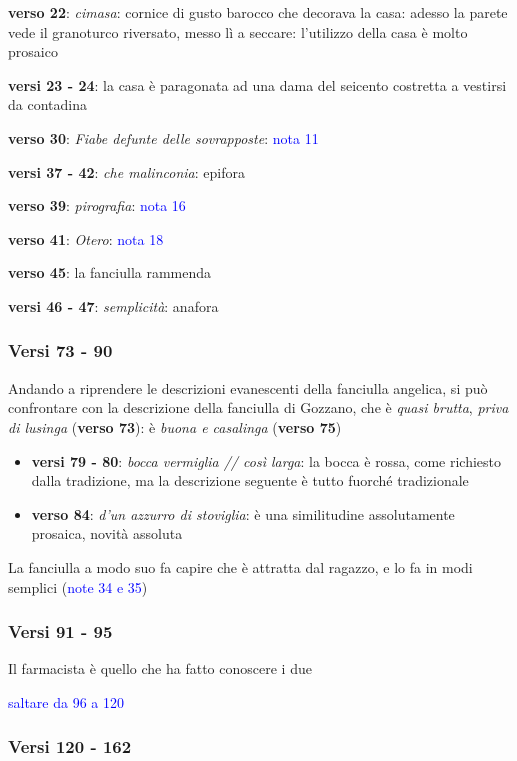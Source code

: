 \documentclass[a4paper, twoside, titlepage]{book}
\newcommand{\elenco}[1]{%
\begin{itemize}
#1
\end{itemize}}
\renewcommand{\emph}[1]{\textcolor{blue}{#1}}
\begin{document}
{	\item \textbf{verso 22}: \textit{cimasa}: cornice di gusto barocco che decorava la casa: adesso la parete vede il granoturco riversato, messo lì a seccare: l’utilizzo della casa è molto prosaico
	\item \textbf{versi 23 - 24}: la casa è paragonata ad una dama del seicento costretta a vestirsi da contadina
	\item \textbf{verso 30}: \textit{Fiabe defunte delle sovrapposte}: \emph{nota 11}
	\item \textbf{versi 37 - 42}: \textit{che malinconia}: epifora
	\item \textbf{verso 39}: \textit{pirografia}: \emph{nota 16}
	\item \textbf{verso 41}: \textit{Otero}: \emph{nota 18}
	\item \textbf{verso 45}: la fanciulla rammenda
	\item \textbf{versi 46 - 47}: \textit{semplicità}: anafora}

\subsubsection{Versi 73 - 90}

Andando a riprendere le descrizioni evanescenti della fanciulla angelica, si può confrontare con la descrizione della fanciulla di Gozzano, che è \textit{quasi brutta}, \textit{priva di lusinga} (\textbf{verso 73}): è \textit{buona e casalinga} (\textbf{verso 75})
\elenco{
	\item \textbf{versi 79 - 80}: \textit{bocca vermiglia // così larga}: la bocca è rossa, come richiesto dalla tradizione, ma la descrizione seguente è tutto fuorché tradizionale
	\item \textbf{verso 84}: \textit{d’un azzurro di stoviglia}: è una similitudine assolutamente prosaica, novità assoluta}

La fanciulla a modo suo fa capire che è attratta dal ragazzo, e lo fa in modi semplici (\emph{note 34 e 35})

\subsubsection{Versi 91 - 95}

Il farmacista è quello che ha fatto conoscere i due

\emph{saltare da 96 a 120}

\subsubsection{Versi 120 - 162}
\end{document}
